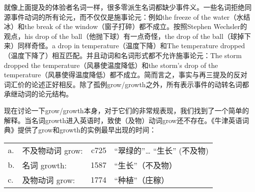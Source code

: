 \begin{exe}
\begin{xlist}[iv.]
\begin{exe}
\begin{xlist}[iv.]
就像上面提及的体验者名词一样，很多零派生名词都缺少事件义。一些名词拒绝同源事件动词的所有论元，而不仅仅是施事论元：例如the freeze of the water（水结冰）和the break of the window（窗子打碎）都不成立。按照Stephen Wechsler的观点，his drop of the ball（他抛下球）有一点奇怪，the drop of the ball（球掉下来）同样奇怪。a drop in temperature（温度下降）和The temperature dropped（温度下降了）相互匹配。并且动词和名词形式都不允许施事论元：The storm
  dropped the temperature（风暴使温度降低）和the storm's drop of the temperature（风暴使得温度降低）都不成立。简而言之，事实与再三提及的反对词汇价的论述正好相反。除了孤例grow/growth之外，所有表示事件的动转名词都承继动词的论元结构。

现在讨论一下grow/growth本身，对于它们的非常规表现，我们找到了一个简单的解释\citep{Wechsler2008a}。当名词growth进入英语时，致使（及物）动词grow还不存在。《牛津英语词典》提供了grow和growth的实例最早出现的时间：

\ea
\label{oed}
\begin{tabular}[t]{@{}l@{~}lrl@{}} 
a. & 不及物动词 grow: &  c725	& “翠绿的”\ldots{} “生长” (不及物)\\
b. & 名词 growth:   &  1587	& “生长”（不及物）\\
c. & 及物动词 grow:   &  1774	& “种植”（庄稼）\\
\end{tabular}
\z


\end{xlist}
\end{exe}
\end{xlist}
\end{exe}
